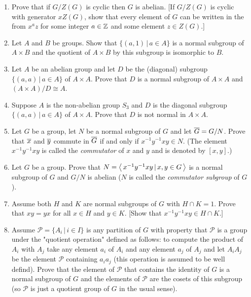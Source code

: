 \documentclass[10pt,a4paper]{report}
\begin{document}
\begin{enumerate}
	\item Prove that if $G/Z(G)$ is cyclic then $G$ is abelian.  [If $G/Z(G)$ is cyclic with generator $xZ(G)$, show that every element of $G$ can be written in the from $x^a z$ for some integer $a \in \mathbb{Z}$ and some element $z \in Z(G)$.]
	
	\item Let $A$ and $B$ be groups.  Show that $\{(a,1)\,|\,a\in A\}$ is a normal subgroup of $A\times B$ and the quotient of $A\times B$ by this subgroup is isomorphic to $B$.
	
	\item Let $A$ be an abelian group and let $D$ be the (diagonal) subgroup $\{(a,a)\,|\,a\in A\}$ of $A\times A$.  Prove that $D$ is a normal subgroup of $A\times A$ and $(A\times A)/D\cong A$.
	
	\item Suppose $A$ is the non-abelian group $S_3$ and $D$ is the diagonal subgroup $\{(a,a)\,|\,a\in A\}$ of $A\times A$.  Prove that $D$ is not normal in $A\times A$.
	
	\item Let $G$ be a group, let $N$ be a normal subgroup of $G$ and let $\overline{G}=G/N$.  Prove that $\overline{x}$ and $\overline{y}$ commute in $\overline{G}$ if and only if $x^{-1}y^{-1}xy \in N$.  (The element $x^{-1}y^{-1}xy$ is called the \textit{commutator} of $x$ and $y$ and is denoted by $[x,y]$.)
	
	\item Let $G$ be a group.  Prove that $N=\left \langle\, x^{-1}y^{-1}xy\,|\,x,y\in G \,\right \rangle$ is a normal subgroup of $G$ and $G/N$ is abelian ($N$ is called the \textit{commutator subgroup} of $G$).
	
	\item Assume both $H$ and $K$ are normal subgroups of $G$ with $H \cap K=1$.  Prove that $xy=yx$ for all $x \in H$ and $y \in K$. [Show that $x^{-1}y^{-1}xy\in H\cap K$.]
	
	\item Assume $\mathcal{P}=\{A_i\,|\,i \in I\}$ is any partition of $G$ with property that $\mathcal{P}$ is a group under the "quotient operation" defined as follows: to compute the product of $A_i$ with $A_j$ take any element $a_i$ of $A_i$ and any element $a_j$ of $A_j$ and let $A_iA_j$ be the element $\mathcal{P}$ containing $a_ia_j$ (this operation is assumed to be well defind).  Prove that the element of $\mathcal{P}$ that contains the identity of $G$ is a normal subgroup of $G$ and the elements of $\mathcal{P}$ are the cosets of this subgroup (so $\mathcal{P}$ is just a quotient group of $G$ in the usual sense).
	
\end{enumerate}
\end{document}
